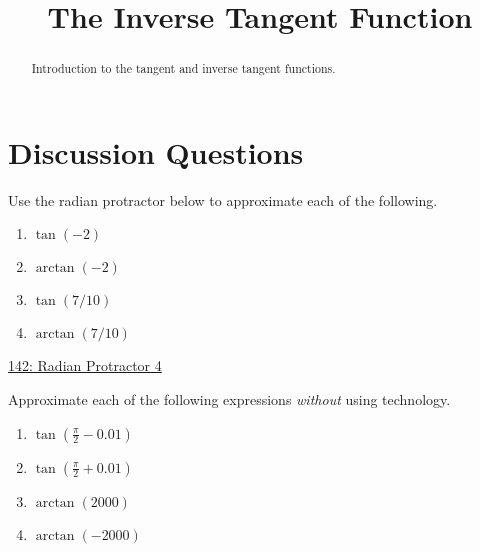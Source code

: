 \documentclass{ximera}
\title{The Inverse Tangent Function}
\begin{document}
\begin{abstract}
Introduction to the tangent and inverse tangent functions.
\end{abstract}
\maketitle



\section{Discussion Questions}

\begin{question} \label{Q45dsfTRETFGree}
Use the radian protractor below to approximate each of the following.
\begin{enumerate}
\item $\tan(-2)$

\item $\arctan(-2)$

\item $\tan(7/10)$

\item $\arctan(7/10)$
\end{enumerate}

\href{https://www.desmos.com/calculator/tb0hegzfdv}{142: Radian Protractor 4}
 
\begin{onlineOnly}
    \begin{center}
\end{center}
\end{onlineOnly}


\end{question}

\begin{question} \label{Q45rghREERwer}
Approximate each of the following expressions \emph{without} using technology.
\begin{enumerate}
\item $\tan \left(\frac{\pi}{2} - 0.01\right)$

\item $\tan \left(\frac{\pi}{2} + 0.01 \right)$

\item $\arctan(2000)$

\item $\arctan(-2000)$
\end{enumerate}

\end{question}
\end{document}
